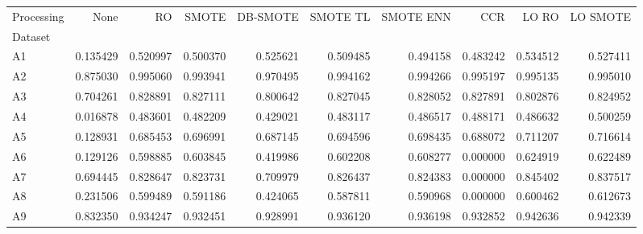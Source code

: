 \begin{tabular}{lrrrrrrrrr}
\toprule
Processing &      None &        RO &     SMOTE &  DB-SMOTE &  SMOTE TL &  SMOTE ENN &       CCR &     LO RO &  LO SMOTE \\
Dataset &           &           &           &           &           &            &           &           &           \\
\midrule
A1      &  0.135429 &  0.520997 &  0.500370 &  0.525621 &  0.509485 &   0.494158 &  0.483242 &  0.534512 &  0.527411 \\
A2      &  0.875030 &  0.995060 &  0.993941 &  0.970495 &  0.994162 &   0.994266 &  0.995197 &  0.995135 &  0.995010 \\
A3      &  0.704261 &  0.828891 &  0.827111 &  0.800642 &  0.827045 &   0.828052 &  0.827891 &  0.802876 &  0.824952 \\
A4      &  0.016878 &  0.483601 &  0.482209 &  0.429021 &  0.483117 &   0.486517 &  0.488171 &  0.486632 &  0.500259 \\
A5      &  0.128931 &  0.685453 &  0.696991 &  0.687145 &  0.694596 &   0.698435 &  0.688072 &  0.711207 &  0.716614 \\
A6      &  0.129126 &  0.598885 &  0.603845 &  0.419986 &  0.602208 &   0.608277 &  0.000000 &  0.624919 &  0.622489 \\
A7      &  0.694445 &  0.828647 &  0.823731 &  0.709979 &  0.826437 &   0.824383 &  0.000000 &  0.845402 &  0.837517 \\
A8      &  0.231506 &  0.599489 &  0.591186 &  0.424065 &  0.587811 &   0.590968 &  0.000000 &  0.600462 &  0.612673 \\
A9      &  0.832350 &  0.934247 &  0.932451 &  0.928991 &  0.936120 &   0.936198 &  0.932852 &  0.942636 &  0.942339 \\
\bottomrule
\end{tabular}
